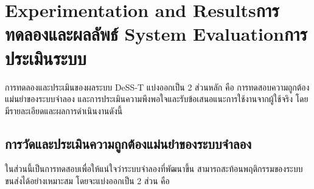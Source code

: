 \chapter{\ifproject%
\ifenglish Experimentation and Results\else การทดลองและผลลัพธ์\fi
\else%
\ifenglish System Evaluation\else การประเมินระบบ\fi
\fi}
\begin{mypara}
    \indent การทดลองและประเมินของผลระบบ DeSS-T แบ่งออกเป็น 2 ส่วนหลัก คือ การทดสอบความถูกต้องแม่นยำของระบบจำลอง 
    และการประเมินความพึงพอใจและรับข้อเสนอแนะการใช้งานจากผู้ใช้จริง โดยมีรายละเอียดและผลการดำเนินงานดังนี้
\end{mypara}


\section{การวัดและประเมินความถูกต้องแม่นยำของระบบจำลอง}
\begin{mypara}
    \indent ในส่วนนี้เป็นการทดสอบเพื่อให้แน่ใจว่าระบบจำลองที่พัฒนาขึ้น 
    สามารถสะท้อนพฤติกรรมของระบบขนส่งได้อย่างเหมาะสม โดยจะแบ่งออกเป็น 2 ส่วน คือ
\end{mypara}
